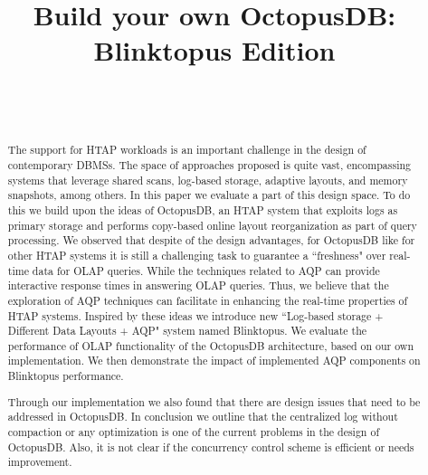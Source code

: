\documentclass[10pt, conference, compsocconf]{IEEEtran}
\begin{document}
\title{Build your own OctopusDB: Blinktopus Edition}
\author{ \\  \\ }

\author{
}

\maketitle

\begin{abstract}
The support for HTAP workloads is an important challenge in the design of contemporary DBMSs. The space of approaches proposed is quite vast, encompassing systems that leverage shared scans, log-based storage, adaptive layouts, and memory snapshots, among others. In this paper we evaluate a part of this design space. To do this we build upon the ideas of OctopusDB, an HTAP system that exploits logs as primary storage and performs copy-based online layout reorganization as part of query processing. We observed that despite of the design advantages, for OctopusDB like for other HTAP systems it is still a challenging task to guarantee a ``freshness" over real-time data for OLAP queries. While the techniques related to AQP can provide interactive response times in answering OLAP queries. Thus, we believe that the exploration of AQP  techniques can facilitate in enhancing the real-time properties of HTAP systems. Inspired by these ideas we introduce new ``Log-based storage + Different Data Layouts + AQP" system named Blinktopus\footnotemark. We evaluate the performance of OLAP functionality of the OctopusDB architecture, based on our own implementation. We then demonstrate the impact of implemented AQP components on Blinktopus performance.

Through our implementation we also found that there are design issues that need to be addressed in OctopusDB. In conclusion we outline that the centralized log without compaction or any optimization is one of the current problems in the design of OctopusDB. Also, it is not clear if the concurrency control scheme is efficient or needs improvement.

\end{abstract}
\end{document}
